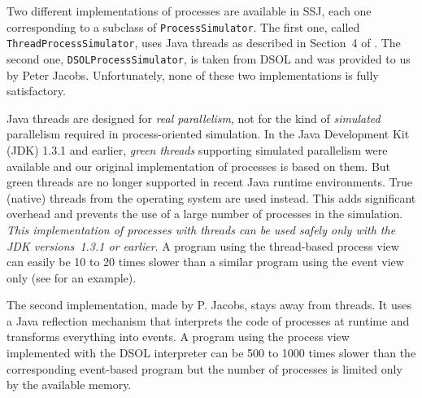 Two different implementations of processes are available in SSJ, each
one corresponding to a subclass of \texttt{ProcessSimulator}.
The first one, called \texttt{ThreadProcessSimulator}, uses Java
threads as described in Section~4 of \cite{sLEC02a}.
The second one, \texttt{DSOLProcessSimulator}, is taken from DSOL
\cite{iJAC05a,sJAC04a} and was 
provided to us by Peter Jacobs.
Unfortunately, none of these two implementations is fully satisfactory.

Java threads are designed for \emph{real parallelism}, not for the kind of
\emph{simulated} parallelism required in process-oriented simulation.
In the Java Development Kit (JDK) 1.3.1 and earlier, \emph{green threads}
supporting simulated parallelism were available and our original 
implementation of processes 
is based on them.
But green threads are no longer supported in recent Java runtime 
environments.  
True (native) threads from the operating system are used instead. 
This adds significant overhead and prevents the use of a large number
of processes in the simulation.
\emph{This implementation of processes with threads can be used safely only
with the JDK versions~1.3.1 or earlier}.
A program using the thread-based process view can easily be 10 to 20 
times slower than a similar program using the event view only
(see \cite{sLEC05a} for an example).

The second implementation, made by P.{} Jacobs, stays away from threads.
It uses a Java reflection mechanism that interprets the code of processes
at runtime and transforms everything into events.
A program using the process view implemented with the DSOL interpreter
can be 500 to 1000 times slower than the corresponding event-based program
but the number of processes is limited only by the available memory.


